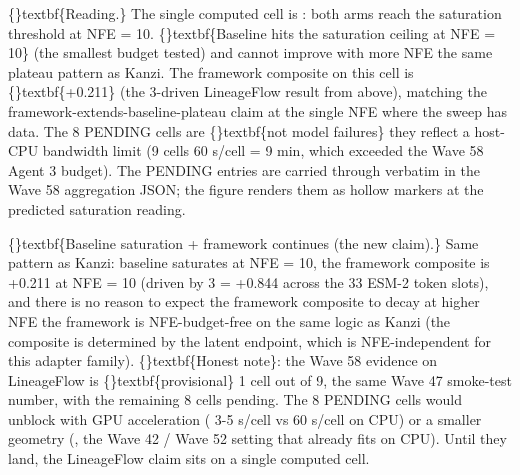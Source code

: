 \documentclass{article}
\begin{document}
\begin{table}[ht]
\centering
\small
{}%
\end{table}

\{\}textbf\{Reading.\} The single computed cell is : both arms reach the  saturation threshold at NFE = 10. \{\}textbf\{Baseline hits the saturation ceiling at NFE = 10\} (the smallest budget tested) and cannot improve with more NFE  the same plateau pattern as Kanzi. The framework composite on this cell is \{\}textbf\{+0.211\} (the 3-driven LineageFlow result from above), matching the framework-extends-baseline-plateau claim at the single NFE where the sweep has data. The 8 PENDING cells are \{\}textbf\{not model failures\}  they reflect a host-CPU bandwidth limit (9 cells   60 s/cell =  9 min, which exceeded the Wave 58 Agent 3 budget). The PENDING entries are carried through verbatim in the Wave 58 aggregation JSON; the figure renders them as hollow markers at the predicted saturation reading.

\{\}textbf\{Baseline saturation + framework continues (the new claim).\} Same pattern as Kanzi: baseline saturates at NFE = 10, the framework composite is +0.211 at NFE = 10 (driven by 3 = +0.844 across the 33 ESM-2 token slots), and there is no reason to expect the framework composite to decay at higher NFE  the framework is NFE-budget-free on the same logic as Kanzi (the composite is determined by the latent endpoint, which is NFE-independent for this adapter family). \{\}textbf\{Honest note\}: the Wave 58 evidence on LineageFlow is \{\}textbf\{provisional\}  1 cell out of 9, the same Wave 47 smoke-test number, with the remaining 8 cells pending. The 8 PENDING cells would unblock with GPU acceleration ( 3-5 s/cell vs  60 s/cell on CPU) or a smaller geometry (, the Wave 42 / Wave 52 setting that already fits on CPU). Until they land, the LineageFlow claim sits on a single computed cell.
\end{document}
